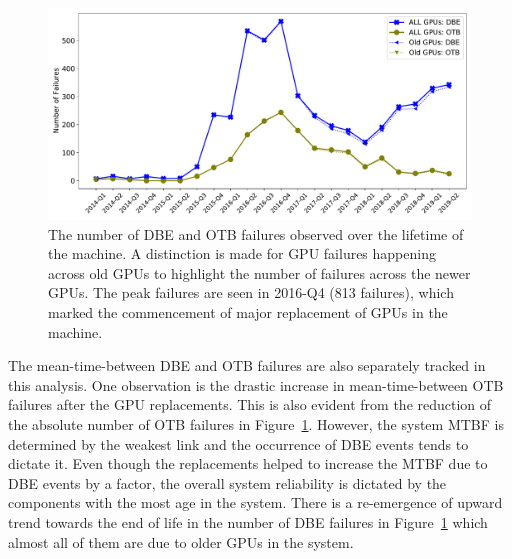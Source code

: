 \begin{figure}[bt]
  \begin{center}
    \includegraphics[width=\columnwidth]{figs/NumFailures_Quarterly_newOld.pdf}
  \end{center}
  \caption{The number of DBE and OTB failures observed over the lifetime of the machine.
A distinction is made for GPU failures happening across old GPUs to highlight the number
of failures across the newer GPUs. The peak failures are seen in 2016-Q4 (813 failures), 
which marked the commencement of major replacement of GPUs in the machine.}
  \label{fig:NumFails_sys}
\end{figure}

The mean-time-between DBE and OTB failures are also separately tracked in this analysis.
One observation is the drastic increase in mean-time-between OTB failures after the GPU replacements.
This is also evident from the reduction of the absolute number of OTB failures in Figure~\ref{fig:NumFails_sys}.
However, the system MTBF is determined by the weakest link and the occurrence of DBE events tends to dictate it.
Even though the replacements helped to increase the MTBF due to DBE events by a factor, the overall system 
reliability is dictated by the components with the most age in the system. There is a re-emergence of upward trend towards 
the end of life in the number of DBE failures in Figure~\ref{fig:NumFails_sys} which almost all of them are due to 
older GPUs in the system. 

